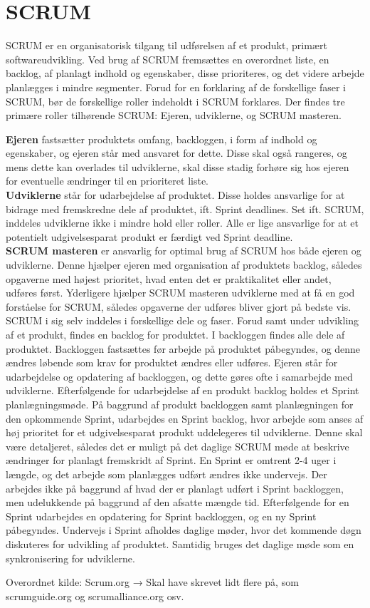 \section{SCRUM}
\textit{}

SCRUM er en organisatorisk tilgang til udførelsen af et produkt, primært softwareudvikling. Ved brug af SCRUM fremsættes en overordnet liste, en backlog, af planlagt indhold og egenskaber, disse prioriteres, og det videre arbejde planlægges i mindre segmenter.
Forud for en forklaring af de forskellige faser i SCRUM, bør de forskellige roller indeholdt i SCRUM forklares. Der findes tre primære roller tilhørende SCRUM: Ejeren, udviklerne, og SCRUM masteren.


\textbf{Ejeren} fastsætter produktets omfang, backloggen, i form af indhold og egenskaber, og ejeren står med ansvaret for dette. Disse skal også rangeres, og mens dette kan overlades til udviklerne, skal disse stadig forhøre sig hos ejeren for eventuelle ændringer til en prioriteret liste.\\
\textbf{Udviklerne} står for udarbejdelse af produktet. Disse holdes ansvarlige for at bidrage med fremskredne dele af produktet, ift. Sprint deadlines. Set ift. SCRUM, inddeles udviklerne ikke i mindre hold eller roller. Alle er lige ansvarlige for at et potentielt udgivelsesparat produkt er færdigt ved Sprint deadline.\\
\textbf{SCRUM masteren} er ansvarlig for optimal brug af SCRUM hos både ejeren og udviklerne. Denne hjælper ejeren med organisation af produktets backlog, således opgaverne med højest prioritet, hvad enten det er praktikalitet eller andet, udføres først. Yderligere hjælper SCRUM masteren udviklerne med at få en god forståelse for SCRUM, således opgaverne der udføres bliver gjort på bedste vis.\\


SCRUM i sig selv inddeles i forskellige dele og faser. Forud samt under udvikling af et produkt, findes en backlog for produktet. I backloggen findes alle dele af produktet. Backloggen fastsættes før arbejde på produktet påbegyndes, og denne ændres løbende som krav for produktet ændres eller udføres. Ejeren står for udarbejdelse og opdatering af backloggen, og dette gøres ofte i samarbejde med udviklerne. Efterfølgende for udarbejdelse af en produkt backlog holdes et Sprint planlægningsmøde. På baggrund af produkt backloggen samt planlægningen for den opkommende Sprint, udarbejdes en Sprint backlog, hvor arbejde som anses af høj prioritet for et udgivelsesparat produkt uddelegeres til udviklerne. Denne skal være detaljeret, således det er muligt på det daglige SCRUM møde at beskrive ændringer for planlagt fremskridt af Sprint. En Sprint er omtrent 2-4 uger i længde, og det arbejde som planlægges udført ændres ikke undervejs. Der arbejdes ikke på baggrund af hvad der er planlagt udført i Sprint backloggen, men udelukkende på baggrund af den afsatte mængde tid. Efterfølgende for en Sprint udarbejdes en opdatering for Sprint backloggen, og en ny Sprint påbegyndes. Undervejs i Sprint afholdes daglige møder, hvor det kommende døgn diskuteres for udvikling af produktet. Samtidig bruges det daglige møde som en synkronisering for udviklerne.


Overordnet kilde: Scrum.org → Skal have skrevet lidt flere på, som scrumguide.org og scrumalliance.org osv.
